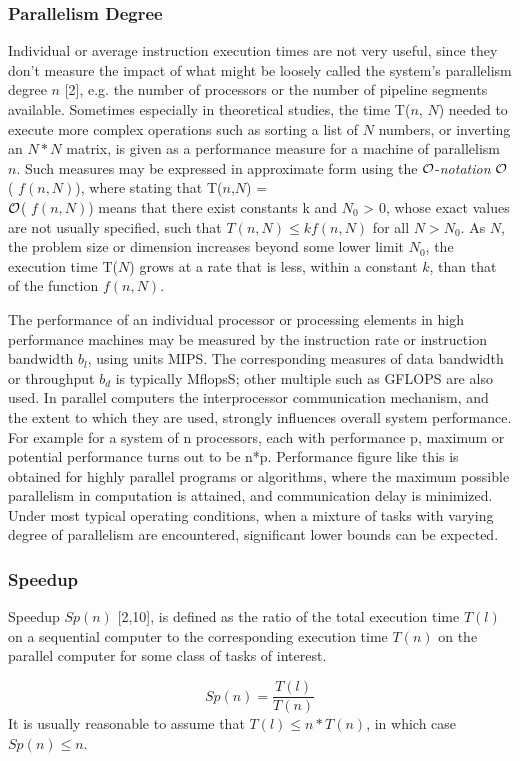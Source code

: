 \subsubsection{Parallelism Degree}
 	Individual or average instruction execution times are not very useful, since they don't measure the impact of what might be loosely called the
system's parallelism degree $n$ [2], e.g. the number of processors or the number of pipeline segments available. Sometimes especially in theoretical studies,
the time T($n$, $N$) needed to execute more complex operations such as sorting a list of $N$ numbers, or inverting an $N*N$ matrix, is given as a performance
measure for a machine of parallelism $n$. Such measures may be expressed in approximate form using the $\cal O$-{\em notation} $ \cal O$( $f(n, N)$), where
stating that T($n$,$N$) = \\$\cal O$( $f(n, N)$) means that there exist constants k and $N_{0}$ > 0, whose exact values are not usually specified, such that
$T(n, N) \leq kf(n, N)$ for all $N > N_{0}$. As $N$, the problem size or dimension increases beyond some lower limit $N_{0}$, the execution time T($N$) grows
at a rate that is less, within a constant $k$, than that of the function $f(n, N)$. \par
\hspace{1in} The performance of an individual processor or processing elements in high performance machines may be measured by the instruction rate or
instruction bandwidth $b_{l}$, using units MIPS. The corresponding measures of data bandwidth or throughput  $b_{d}$ is typically MflopsS; other multiple such
as GFLOPS are also used. In parallel computers the interprocessor communication mechanism, and the extent to which they are used, strongly influences overall
system performance. For example for a system of n processors, each with performance p, maximum or potential performance turns out to be n*p. Performance
figure like this is obtained for highly parallel programs or algorithms, where the maximum possible parallelism in computation is attained, and
communication delay is minimized. Under most typical operating conditions, when a mixture of tasks with varying degree of parallelism are encountered,
significant lower bounds can be expected.

\subsubsection{Speedup}
Speedup $Sp(n)$ [2,10], is defined as the ratio of the total execution time $T(l)$ on a sequential computer to the corresponding execution time $T(n)$ on the
parallel
computer for some class of tasks of interest.\par
\begin{equation}
Sp(n) = \frac{T(l)}{T(n)}
\end{equation}
\hspace{1in}It is usually reasonable to assume that $T(l) \leq n*T(n)$, in which case $Sp(n) \leq n$.

